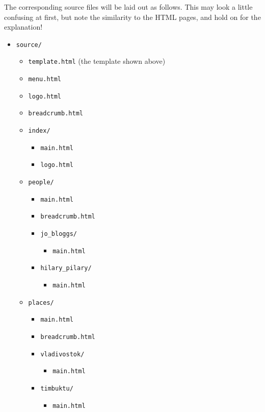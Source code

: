 \documentclass[english]{scrartcl}
\begin{document}
The corresponding source files will be laid out as follows. This may
look a little confusing at first, but note the similarity to the HTML
pages, and hold on for the explanation!

\begin{itemize}
\item \verb|source/|
  \begin{itemize}
  \item \verb|template.html| (the template shown above)
  \item \verb|menu.html|
  \item \verb|logo.html|
  \item \verb|breadcrumb.html|
  \item \verb|index/|
    \begin{itemize}
    \item \verb|main.html|
    \item \verb|logo.html|
    \end{itemize}
  \item \verb|people/|
    \begin{itemize}
    \item \verb|main.html|
    \item \verb|breadcrumb.html|
    \item \verb|jo_bloggs/|
      \begin{itemize}
      \item \verb|main.html|
      \end{itemize}
    \item \verb|hilary_pilary/|
      \begin{itemize}
      \item \verb|main.html|
      \end{itemize}
    \end{itemize}
  \item \verb|places/|
    \begin{itemize}
    \item \verb|main.html|
    \item \verb|breadcrumb.html|
    \item \verb|vladivostok/|
      \begin{itemize}
      \item \verb|main.html|
      \end{itemize}
    \item \verb|timbuktu/|
      \begin{itemize}
      \item \verb|main.html|
      \end{itemize}
    \end{itemize}
  \end{itemize}
\end{itemize}
\end{document}
